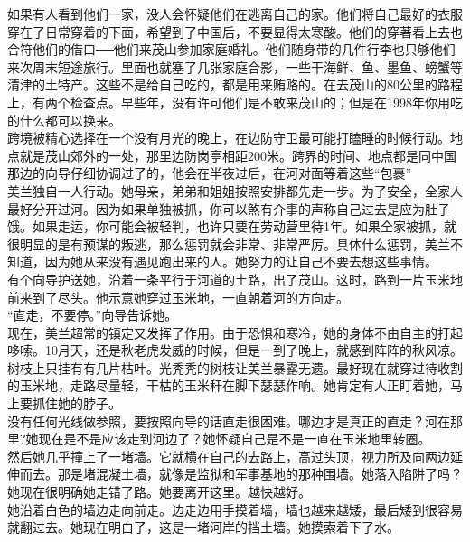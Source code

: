 如果有人看到他们一家，没人会怀疑他们在逃离自己的家。他们将自己最好的衣服穿在了日常穿着的下面，希望到了中国后，不要显得太寒酸。他们的穿著看上去也合符他们的借口──他们来茂山参加家庭婚礼。他们随身带的几件行李也只够他们来次周末短途旅行。里面也就塞了几张家庭合影，一些干海鲜、鱼、墨鱼、螃蟹等清津的土特产。这些不是给自己吃的，都是用来贿赂的。在去茂山的80公里的路程上，有两个检查点。早些年，没有许可他们是不敢来茂山的；但是在1998年你用吃的什么都可以换来。\\

跨境被精心选择在一个没有月光的晚上，在边防守卫最可能打瞌睡的时候行动。地点就是茂山郊外的一处，那里边防岗亭相距200米。跨界的时间、地点都是同中国那边的向导仔细协调过了的，他会在半夜过后，在河对面等着这些“包裹”\\

美兰独自一人行动。她母亲，弟弟和姐姐按照安排都先走一步。为了安全，全家人最好分开过河。因为如果单独被抓，你可以煞有介事的声称自己过去是应为肚子饿。如果走运，你可能会被轻判，也许只要在劳动营里待1年。如果全家被抓，就很明显的是有预谋的叛逃，那么惩罚就会非常、非常严厉。具体什么惩罚，美兰不知道，因为她从来没有遇见跑出来的人。她努力的让自己不要去想这些事情。\\

有个向导护送她，沿着一条平行于河道的土路，出了茂山。这时，路到一片玉米地前来到了尽头。他示意她穿过玉米地，一直朝着河的方向走。\\

“直走，不要停。”向导告诉她。\\

现在，美兰超常的镇定又发挥了作用。由于恐惧和寒冷，她的身体不由自主的打起哆嗦。10月天，还是秋老虎发威的时候，但是一到了晚上，就感到阵阵的秋风凉。树枝上只挂有有几片枯叶。光秃秃的树枝让美兰暴露无遗。最好现在就穿过待收割的玉米地，走路尽量轻，干枯的玉米秆在脚下瑟瑟作响。她肯定有人正盯着她，马上要抓住她的脖子。\\

没有任何光线做参照，要按照向导的话直走很困难。哪边才是真正的直走？河在那里?她现在是不是应该走到河边了？她怀疑自己是不是一直在玉米地里转圈。\\

然后她几乎撞上了一堵墙。它就横在自己的去路上，高过头顶，视力所及向两边延伸而去。那是堵混凝土墙，就像是监狱和军事基地的那种围墙。她落入陷阱了吗？她现在很明确她走错了路。她要离开这里。越快越好。\\

她沿着白色的墙边走向前走。边走边用手摸着墙，墙也越来越矮，最后矮到很容易就翻过去。她现在明白了，这是一堵河岸的挡土墙。她摸索着下了水。\\

